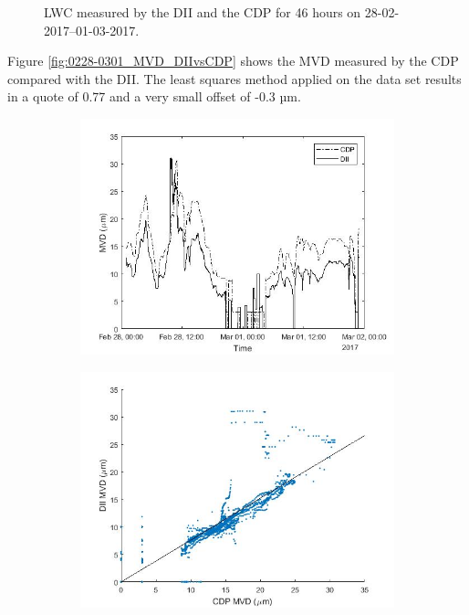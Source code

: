 \begin{figure}[hb]
\begin{subfigure}{.5\textwidth}
  \label{fig:0228-0301_LWC_DIIvsCDP}
\end{subfigure}
\caption{LWC measured by the DII and the CDP for 46 hours on 28-02-2017--01-03-2017.}
\label{fig:0228-0301_lwc}
\end{figure}

Figure \ref{fig:0228-0301_MVD_DIIvsCDP} shows the MVD measured by the CDP compared with the DII. The least squares method applied on the data set results in a quote of 0.77 and a very small offset of -0.3 µm.

\begin{figure}[ht]
\centering
\begin{subfigure}{.5\textwidth}
  \centering
  \includegraphics[width=1\linewidth]{figures/0228-0301/30min_mvd_CDP_DII_170228-170301_19212_0LpartDII_214646_0LpartCDP}
  \label{fig:0228-0301_MVDvstime}
\end{subfigure}
\begin{subfigure}{.49\textwidth}
  \centering
  \includegraphics[width=1\linewidth]{figures/0228-0301/Mvdquote_DII-CDP_17022801-17030123_2760min_leastsquare0_7682}

\end{subfigure}
\end{figure}
